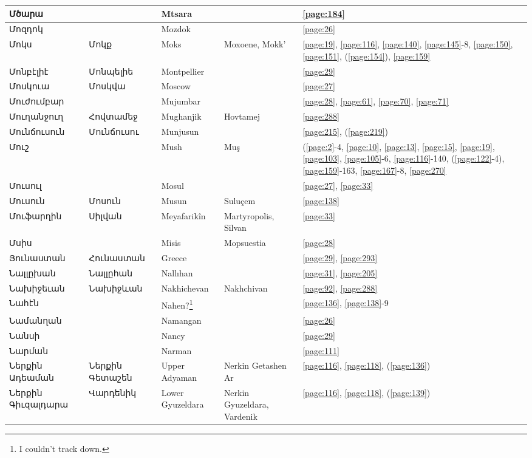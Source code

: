 \begin{center}
\begin{longtable}{|p{}|p{3cm}|p{3cm}|p{2cm}|p{3cm}|}
Մծարա& &Mtsara & &\ref{page:184}\\ \hline
Մոզդոկ& & Mozdok& &\ref{page:26}\\ \hline
Մոկս& Մոկք& Moks&Moxoene, Mokk' &\ref{page:19}, \ref{page:116}, \ref{page:140}, \ref{page:145}-8, \ref{page:150}, \ref{page:151}, (\ref{page:154}), \ref{page:159}\\ \hline
Մոնբէլիէ&Մոնպելիե & Montpellier& &\ref{page:29}\\ \hline
Մոսկուա& Մոսկվա&Moscow & &\ref{page:27}\\ \hline
Մուժումբար& & Mujumbar& &\ref{page:28}, \ref{page:61}, \ref{page:70}, \ref{page:71}\\ \hline
Մուղանջուղ& Հովտամեջ &  Mughanjik &Hovtamej &\ref{page:288}\\ \hline
Մունճուսուն&Մունճուսու&Munjusun & &\ref{page:215}, (\ref{page:219})\\ \hline
Մուշ& & 
Mush&Muş &(\ref{page:2}-4, \ref{page:10}, \ref{page:13}, \ref{page:15}, \ref{page:19}, \ref{page:103}, \ref{page:105}-6, \ref{page:116}-140, (\ref{page:122}-4), \ref{page:159}-163, \ref{page:167}-8, \ref{page:270}\\ \hline
Մուսուլ& &Mosul & &\ref{page:27}, \ref{page:33}\\ \hline
Մուսուն& Մոսուն & Musun &Suluçem &\ref{page:138}\\ \hline
Մուֆարղին&Սիլվան &Meyafarikîn &Martyropolis, Silvan &\ref{page:33}\\ \hline
Մսիս& & Misis& Mopsuestia&\ref{page:28}\\ \hline
Յունաստան&Հունաստան & Greece& &\ref{page:29}, \ref{page:293}\\ \hline
Նալլըխան& Նալլըհան &Nallıhan & &\ref{page:31}, \ref{page:205}\\ \hline
Նախիջեւան&Նախիջևան &
Nakhichevan& Nakhchivan&\ref{page:92}, \ref{page:288}\\ \hline
Նահէն& &Nahen?\footnote{I couldn't track down.} & &\ref{page:136}, \ref{page:138}-9\\ \hline
Նամանղան& & Namangan& &\ref{page:26}\\ \hline
Նանսի& & Nancy& &\ref{page:29}\\ \hline
Նարման& & Narman& &\ref{page:111}\\ \hline
Ներքին Ադեաման& Ներքին Գետաշեն& Upper Adyaman&  Nerkin Getashen Ar&\ref{page:116}, \ref{page:118}, (\ref{page:136})\\ \hline
Ներքին Գիւզալդարա& Վարդենիկ &Lower Gyuzeldara & Nerkin Gyuzeldara, Vardenik &\ref{page:116}, \ref{page:118}, (\ref{page:139})\\ \hline

\end{longtable}
\end{center}
